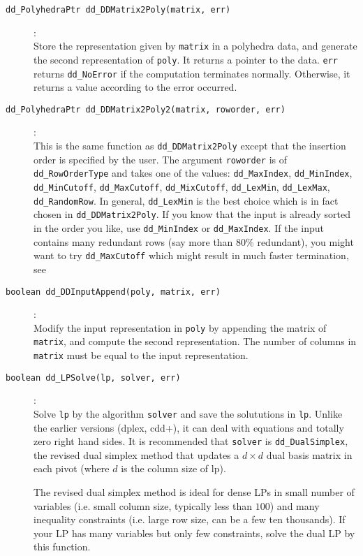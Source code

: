 \documentclass[11pt]{article}
\newcommand {\0} {{\bf 0}}
\begin{document}
\begin{description}
\item[{\tt dd\_PolyhedraPtr dd\_DDMatrix2Poly(matrix, err)}]:\\
Store the representation given by {\tt matrix} in a polyhedra data, and
generate the second representation of {\tt *poly}.  It returns
a pointer to the data. {\tt *err}
returns {\tt dd\_NoError} if the computation terminates normally.  Otherwise,
it returns a value according to the error occurred.

\item[{\tt dd\_PolyhedraPtr dd\_DDMatrix2Poly2(matrix, roworder, err)}]:\\
This is the same function as  {\tt dd\_DDMatrix2Poly} except that the insertion
order is specified by the user.  The argument {\tt roworder} is of {\tt dd\_RowOrderType}
and takes one of the values:
  {\tt dd\_MaxIndex}, {\tt dd\_MinIndex}, {\tt dd\_MinCutoff}, {\tt dd\_MaxCutoff}, {\tt dd\_MixCutoff},
   {\tt dd\_LexMin}, {\tt dd\_LexMax}, {\tt dd\_RandomRow}.   In general, {\tt dd\_LexMin} is
the best choice which is in fact chosen in {\tt dd\_DDMatrix2Poly}.  If you know that
the input is already sorted in the order you like, use  {\tt dd\_MinIndex} or  {\tt dd\_MaxIndex}.
If the input contains many redundant rows (say more than $80\%$ redundant),
you might want to try {\tt dd\_MaxCutoff} which might result in much faster termination,
see \cite{abs-hgach-97,fp-ddmr-96}

\item[{\tt boolean dd\_DDInputAppend(poly, matrix, err)}]:\\
Modify the input representation in {\tt *poly}
by appending the matrix of {\tt *matrix}, and compute
the second representation.  The number of columns in
{\tt *matrix} must be equal to the input representation.

\item[{\tt boolean dd\_LPSolve(lp, solver, err)}]:\\
Solve {\tt lp} by the algorithm {\tt solver} and save
the solututions in {\tt *lp}.  Unlike the earlier versions
(dplex, cdd+), it can deal with equations and totally zero right
hand sides.   It is recommended that {\tt solver} is
{\tt dd\_DualSimplex}, the revised dual simplex method
that updates a $d\times d$ dual basis matrix in each pivot (where
$d$ is the column size of lp).

The revised dual simplex method is ideal for dense LPs in small number of variables
(i.e. small column size, typically less than $100$)
and many inequality constraints (i.e. large row size, can be a few ten thousands).
If your LP has many variables but only few constraints, solve the dual LP by
this function.


\end{description}
\end{document}
